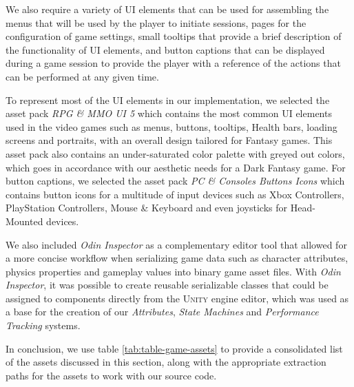 We also require a variety of UI elements that can be used for assembling the menus that will be used by the player to initiate sessions, pages for the configuration of game settings, small tooltips that provide a brief description of the functionality of UI elements, and button captions that can be displayed during a game session to provide the player with a reference of the actions that can be performed at any given time.

To represent most of the UI elements in our implementation, we selected the asset pack \emph{RPG \& MMO UI 5} which contains the most common UI elements used in the video games such as menus, buttons, tooltips, Health bars, loading screens and portraits, with an overall design tailored for Fantasy games. This asset pack also contains an under-saturated color palette with greyed out colors, which goes in accordance with our aesthetic needs for a Dark Fantasy game. For button captions, we selected the asset pack \emph{PC \& Consoles Buttons Icons} which contains button icons for a multitude of input devices such as Xbox Controllers, PlayStation Controllers, Mouse \& Keyboard and even joysticks for Head-Mounted devices.

We also included \emph{Odin Inspector} as a complementary editor tool that allowed for a more concise workflow when serializing game data such as character attributes, physics properties and gameplay values into binary game asset files. With \emph{Odin Inspector}, it was possible to create reusable serializable classes that could be assigned to components directly from the \textsc{Unity} engine editor, which was used as a base for the creation of our \emph{Attributes}, \emph{State Machines} and \emph{Performance Tracking} systems.

In conclusion, we use table \ref{tab:table-game-assets} to provide a consolidated list of the assets discussed in this section, along with the appropriate extraction paths for the assets to work with our source code.





